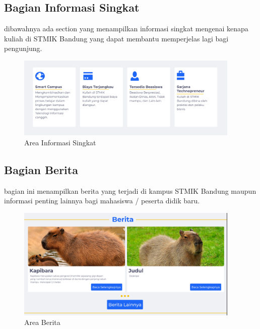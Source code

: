 \documentclass[a4paper, 12pt]{article}
\begin{document}
\subsection{Bagian Informasi Singkat}
dibawahnya ada section yang menampilkan informasi singkat mengenai kenapa kuliah di STMIK Bandung yang dapat membantu memperjelas lagi bagi pengunjung. 
\begin{figure}[H]
  \begin{center}
    \includegraphics[width=0.95\textwidth]{images/gambar4.png}
  \end{center}
  \caption{Area Informasi Singkat}\label{fig:informasi}
\end{figure}

\subsection{Bagian Berita}
bagian ini menampilkan berita yang terjadi di kampus STMIK Bandung maupun informasi penting lainnya bagi mahasiswa / peserta didik baru. 
\begin{figure}[H]
  \begin{center}
    \includegraphics[width=0.95\textwidth]{images/gambar5.png}
  \end{center}
  \caption{Area Berita}\label{fig:berita}
\end{figure}
\end{document}
